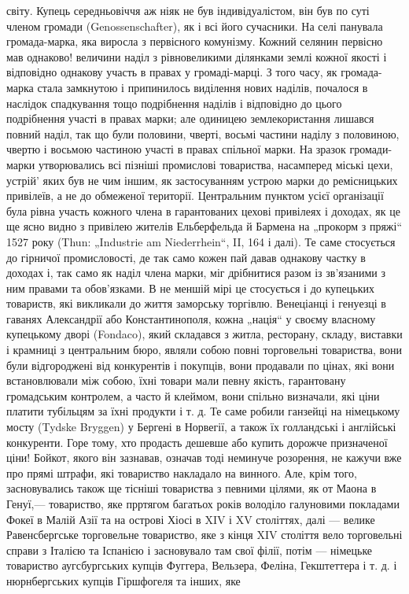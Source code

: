 \parcont{}  %
світу. Купець середньовіччя аж ніяк не був індивідуалістом, він був по суті членом громади (Genossenschafter), як і всі його сучасники. На селі панувала громада-марка, яка виросла з первісного комунізму. Кожний селянин первісно мав однаково!  величини наділ з рівновеликими ділянками землі кожної якості і відповідно однакову участь в правах у громаді-марці. З того
часу, як громада-марка стала замкнутою і припинилось виділення нових наділів, почалося в наслідок спадкування тощо подрібнення наділів і відповідно до цього подрібнення участі в правах марки; але одиницею землекористання лишався повний наділ, так що були половини, чверті, восьмі частини наділу з половиною, чвертю і восьмою частиною участі в правах спільної марки. На зразок громади-марки утворювались всі пізніші промислові товариства, насамперед міські цехи, устрій'
яких був не чим іншим, як застосуванням устрою марки до ремісницьких привілеїв, а не до обмеженої території. Центральним пунктом усієї організації була рівна участь кожного члена в гарантованих цехові привілеях і доходах, як це ще ясно видно з привілею жителів Ельберфельда й Бармена на „прокорм з пряжі“ 1527 року (Thun: „Industrie am Niederrhein“,  II, 164 і далі). Те саме стосується до гірничої промисловості, де так само кожен пай давав однакову частку в доходах і, так само як наділ члена марки, міг дрібнитися разом із зв’язаними з ним правами та обов’язками. В не меншій мірі це стосується і до купецьких товариств, які викликали до життя заморську торгівлю. Венеціанці і генуезці в гаванях Александрії або Константинополя, кожна „нація“ у своєму власному купецькому дворі (Fondaco), який складався з житла, ресторану, складу, виставки і крамниці з центральним бюро, являли собою повні торговельні товариства, вони були відгороджені від конкурентів і покупців, вони продавали по цінах, які вони встановлювали між собою, їхні товари мали певну якість, гарантовану громадським контролем, а часто й клеймом, вони спільно визначали, які ціни платити тубільцям за їхні продукти і т. д. Те саме робили ганзейці на німецькому мосту (Tydske Bryggen) у Бергені в Норвегії, а також їх голландські і англійські конкуренти. Горе тому, хто продасть дешевше або купить дорожче призначеної ціни! Бойкот, якого він зазнавав, означав тоді неминуче розорення, не кажучи вже про прямі штрафи, які товариство накладало на винного. Але, крім того, засновувались також ще тісніші товариства з певними цілями, як от Маона в Генуї,—  товариство, яке прртягом багатьох років володіло галуновими покладами Фокеї в Малій Азії та на острові Хіосі в XIV і XV  століттях, далі — велике Равенсбергське торговельне товариство, яке з кінця XIV століття вело торговельні справи з Італією та Іспанією і засновувало там свої філії, потім — німецьке товариство аугсбургських купців Фуггера, Вельзера, Феліна, Гекштеттера і т. д. і нюрнбергських купців Гіршфогеля та інших, яке
\parbreak{}  %
